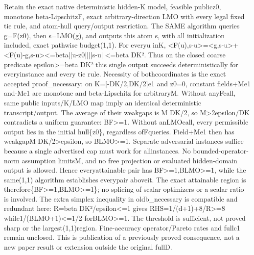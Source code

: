 \documentclass[10pt,a4paper]{article}
\begin{document}
\begingroup\raggedright\sloppy Retain the exact native deterministic hidden-K model,\allowbreak{} feasible publicz0,\allowbreak{} monotone beta-LipschitzF,\allowbreak{} exact arbitrary-direction LMO with every legal fixed tie rule,\allowbreak{} and atom-hull query/\allowbreak{}output restriction. The SAME algorithm queries g=\allowbreak{}F(z0),\allowbreak{} then s=\allowbreak{}LMO(g),\allowbreak{} and outputs this atom s,\allowbreak{} with all initialization included,\allowbreak{} exact pathwise budget(1,\allowbreak{}1). For everyu inK,\allowbreak{} <F(u),\allowbreak{}s-u>=\allowbreak{}<g,\allowbreak{}s-u>+<F(u)-g,\allowbreak{}s-u><=\allowbreak{}beta||u-z0||||s-u||<=\allowbreak{}beta DK{\AtlasUnicodeText ²}\allowbreak{}. Thus on the closed coarse predicate epsilon>=\allowbreak{}beta DK{\AtlasUnicodeText ²}\allowbreak{} this single output succeeds deterministically for everyinstance and every tie rule. Necessity of bothcoordinates is the exact accepted proof\_\allowbreak{}necessary:\allowbreak{} on K=\allowbreak{}[-DK/\allowbreak{}2,\allowbreak{}DK/\allowbreak{}2]e1 and z0=\allowbreak{}0,\allowbreak{} constant fields+Me1 and-Me1 are monotone and beta-Lipschitz for arbitraryM. Without anyFcall,\allowbreak{} same public inputs/\allowbreak{}K/\allowbreak{}LMO map imply an identical deterministic transcript/\allowbreak{}output. The average of their weakgaps is M DK/\allowbreak{}2,\allowbreak{} so M>2epsilon/\allowbreak{}DK contradicts a uniform guarantee:\allowbreak{} BF>=\allowbreak{}1. Without anLMOcall,\allowbreak{} every permissible output lies in the initial hull\{z0\},\allowbreak{} regardless ofFqueries. Field+Me1 then has weakgapM DK/\allowbreak{}2>epsilon,\allowbreak{} so BLMO>=\allowbreak{}1. Separate adversarial instances suffice because a single advertised cap must work for allinstances. No bounded-operator-norm assumption limitsM,\allowbreak{} and no free projection or evaluated hidden-domain output is allowed. Hence everyattainable pair has BF>=\allowbreak{}1,\allowbreak{}BLMO>=\allowbreak{}1,\allowbreak{} while the same(1,\allowbreak{}1) algorithm establishes everypair aboveit. The exact attainable region is therefore\{BF>=\allowbreak{}1,\allowbreak{}BLMO>=\allowbreak{}1\};\allowbreak{} no splicing of scalar optimizers or a scalar ratio is involved. The extra simplex inequality in oldb\_\allowbreak{}necessary is compatible and redundant here:\allowbreak{} R=\allowbreak{}beta DK{\AtlasUnicodeText ²}\allowbreak{}/\allowbreak{}epsilon<=\allowbreak{}1 gives RHS=\allowbreak{}1/\allowbreak{}(d+1)+8/\allowbreak{}R>=\allowbreak{}8 while1/\allowbreak{}(BLMO+1)<=\allowbreak{}1/\allowbreak{}2 forBLMO>=\allowbreak{}1. The threshold is sufficient,\allowbreak{} not proved sharp or the largest(1,\allowbreak{}1)region. Fine-accuracy operator/\allowbreak{}Pareto rates and fullc1 remain unclosed. This is publication of a previously proved consequence,\allowbreak{} not a new paper result or extension outside the original fullD.\par\endgroup
\end{document}
